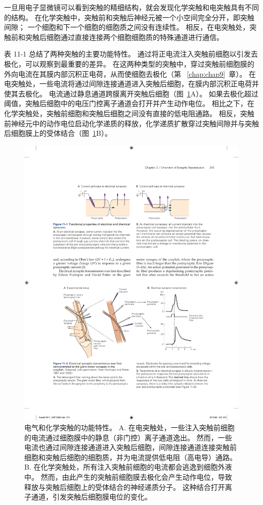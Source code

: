 一旦用电子显微镜可以看到突触的精细结构，就会发现化学突触和电突触具有不同的结构。
在化学突触中，突触前和突触后神经元被一个小空间完全分开，即突触间隙；
一个细胞和下一个细胞的细胞质之间没有连续性。
相反，在电突触处，突触前和突触后细胞通过直接连接两个细胞细胞质的特殊通道进行通信。


表 11-1 总结了两种突触的主要功能特性。
通过将正电流注入突触前细胞以引发去极化，可以观察到最重要的差异。
在这两种类型的突触中，穿过突触前细胞膜的外向电流在其膜内部沉积正电荷，从而使细胞去极化（第 ~\ref{chap:chap9}~章）。 
在电突触处，一些电流将通过间隙连接通道进入突触后细胞，在膜内部沉积正电荷并使其去极化。
电流通过静息通道跨膜离开突触后细胞（图~\ref{fig:11_1}A）。 
如果去极化超过阈值，突触后细胞中的电压门控离子通道会打开并产生动作电位。
相比之下，在化学突触处，突触前细胞和突触后细胞之间没有直接的低电阻通路。
相反，突触前神经元中的动作电位启动化学递质的释放，化学递质扩散穿过突触间隙并与突触后细胞膜上的受体结合（图~\ref{fig:11_1}B）。


\begin{figure}[htbp]
	\centering
	\includegraphics[width=0.6\linewidth]{chap11/fig_11_1}
	\caption{电气和化学突触的功能特性。 A. 在电突触处，一些注入突触前细胞的电流通过细胞膜中的静息（非门控）离子通道逸出。 然而，一些电流也通过间隙连接通道进入突触后细胞，间隙连接通道连接突触前细胞和突触后细胞的细胞质，并为电流提供低电阻（高电导）通路。 B. 在化学突触处，所有注入突触前细胞的电流都会逃逸到细胞外液中。 然而，由此产生的突触前细胞膜去极化会产生动作电位，导致释放与突触后细胞上的受体结合的神经递质分子。 这种结合打开离子通道，引发突触后细胞膜电位的变化。}
	\label{fig:11_1}
\end{figure}


